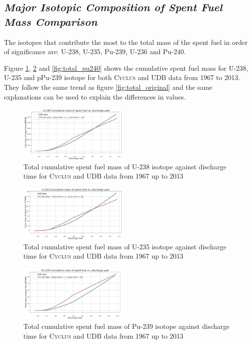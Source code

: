 \documentclass{anstrans}
\newcommand{\Cyclus}{\textsc{Cyclus}\xspace}%
\begin{document}
\subsection{\textit{Major Isotopic Composition of  Spent Fuel Mass Comparison}}
The isotopes that contribute the most to the total mass of the spent fuel in order of significance are: U-238, U-235, Pu-239, U-236 and Pu-240.   

Figure \ref{fig:total_u238}, \ref{fig:total_u235} and \ref{fig:total_pu240} shows the cumulative spent fuel mass for U-238, U-235 and pPu-239 isotope for both \Cyclus and UDB data from 1967 to 2013.
They follow the same trend as figure \ref{fig:total_original} and the same explanations can be used to explain the differences in values. 

\begin{figure}[ht] %
	\centering
	\includegraphics[width=0.48\textwidth]{U-238_cumulative_mass_spent_fuel_original}
	\caption{Total cumulative spent fuel mass of U-238 isotope against discharge time for \Cyclus and UDB data from 1967 up to 2013}
	\label{fig:total_u238}
\end{figure}

\begin{figure}[ht] %
	\centering
	\includegraphics[width=0.48\textwidth]{U-235_cumulative_mass_spent_fuel_original}
	\caption{Total cumulative spent fuel mass of U-235 isotope against discharge time for \Cyclus and UDB data from 1967 up to 2013}
	\label{fig:total_u235}
\end{figure}

\begin{figure}[hb] %
	\centering
	\includegraphics[width=0.48\textwidth]{Pu-239_cumulative_mass_spent_fuel_original}
	\caption{Total cumulative spent fuel mass of Pu-239 isotope against discharge time for \Cyclus and UDB data from 1967 up to 2013}
	\label{fig:total_pu239}
\end{figure}
\pagebreak
\end{document}
